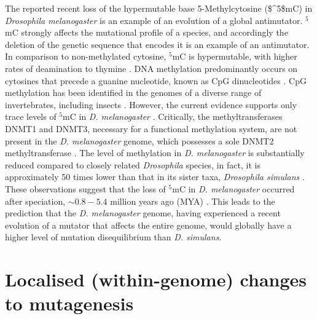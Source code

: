 The reported recent loss of the hypermutable base 5-Methylcytosine (\acrshort{$^5$mC}) in \textit{Drosophila melanogaster} is an example of an evolution of a global antimutator. $^5$mC strongly affects the mutational profile of a species, and accordingly the deletion of the genetic sequence that encodes it is an example of an antimutator. In comparison to non-methylated cytosine, $^5$mC is hypermutable, with higher rates of deamination to thymine \citep{Shen1994TheDNA, Coulondre1978MolecularColi}. DNA methylation predominantly occurs on cytosines that precede a guanine nucleotide, known as CpG dinucleotides \citep{Holliday1975DNADevelopment}. CpG methylation has been identified in the genomes of a diverse range of invertebrates, including insects \citep{Wang2010EstimatingLoci}. However, the current evidence supports only trace levels of $^5$mC in \textit{D. melanogaster} \citep{Capuano2014CytosineSpecies, Deshmukh2018LevelsGenome}. Critically, the methyltransferases DNMT1 and DNMT3, necessary for a functional methylation system, are not present in the \textit{D. melanogaster} genome, which possesses a sole DNMT2 methyltransferase \citep{Goll2005EukaryoticMethyltransferases, Tweedie1999VestigesMelanogaster}. The level of methylation in \textit{D. melanogaster} is substantially reduced compared to closely related \textit{Drosophila} species, in fact, it is approximately 50 times lower than that in its sister taxa, \textit{Drosophila simulans} \citep{Deshmukh2018LevelsGenome}. These observations suggest that the loss of $^5$mC in \textit{D. melanogaster} occurred after speciation, $\sim 0.8-5.4$ million years ago (MYA) \citep{Cutter2008DivergenceRate, Wang2010EstimatingLoci, Tamura2004TemporalClocks}. This leads to the prediction that the \textit{D. melanogaster} genome, having experienced a recent evolution of a mutator that affects the entire genome, would globally have a higher level of mutation disequilibrium than \textit{D. simulans}. 

\section{Localised (within-genome) changes to mutagenesis}

